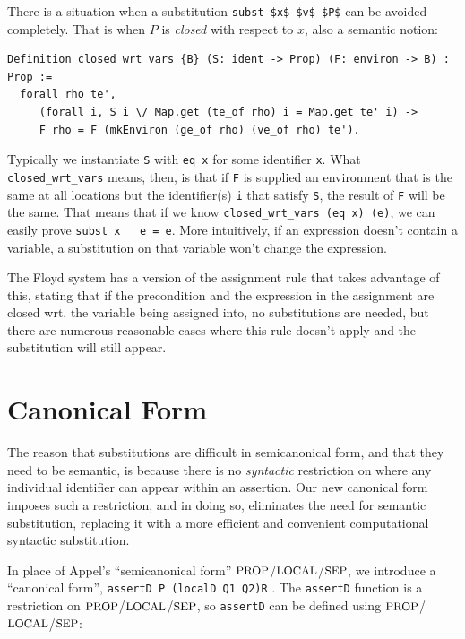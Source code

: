 \documentclass{puthesis}
\begin{document}
There is a situation when a substitution \lstinline|subst $x$ $v$ $P$| can
be avoided completely. That is when $P$ is \emph{closed} with respect to 
$x$, also a semantic notion:

\begin{lstlisting}
Definition closed_wrt_vars {B} (S: ident -> Prop) (F: environ -> B) : Prop := 
  forall rho te',  
     (forall i, S i \/ Map.get (te_of rho) i = Map.get te' i) ->
     F rho = F (mkEnviron (ge_of rho) (ve_of rho) te').
\end{lstlisting}

Typically we instantiate \lstinline|S| with \lstinline|eq x| for some
identifier \lstinline|x|.  What \lstinline|closed_wrt_vars| means,
then, is that if \lstinline|F| is supplied an environment that is the
same at all locations but the identifier(s) \lstinline|i| that satisfy
\lstinline|S|, the result of \lstinline|F| will be the same. That
means that if we know \lstinline|closed_wrt_vars (eq x) (e)|, we can
easily prove \lstinline|subst x _ e = e|. More intuitively, if an
expression doesn't contain a variable, a substitution on that variable
won't change the expression.

The Floyd system has a version of the assignment rule that takes
advantage of this, stating that if the precondition and the expression
in the assignment are closed wrt. the variable being assigned into, no
substitutions are needed, but there are numerous reasonable cases
where this rule doesn't apply and the substitution will still appear.

\section{Canonical Form}
\label{sec:cform}
The reason that substitutions are difficult in semicanonical form, and
that they need to be semantic, is because there is no \emph{syntactic}
restriction on where any individual identifier can appear within an
assertion. Our new canonical form imposes such a restriction, and in doing
so, eliminates the need for semantic substitution, replacing it with a
more efficient and convenient computational syntactic substitution.

In place of Appel's ``semicanonical form'' $\mbox{\small PROP}$/$\mbox{\small LOCAL}$/$\mbox{\small SEP}$, we
introduce a ``canonical form'', \linebreak \lstinline|assertD P (localD Q1 Q2)R|
.
The \lstinline|assertD| function is a restriction on
$\mbox{\small PROP}$/$\mbox{\small LOCAL}$/$\mbox{\small SEP}$, so \lstinline|assertD| can be defined using
$\mbox{\small PROP}$/$\mbox{\small LOCAL}$/$\mbox{\small SEP}$:
\end{document}
